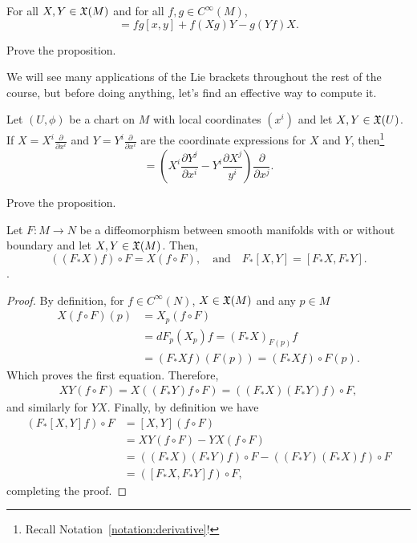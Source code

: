 \begin{proposition}
  For all $X, Y \in \mathfrak{X}(M)$ and for all $f,g\in C^\infty(M)$,
  \begin{equation}
    [fX, gY] = fg[x,y] + f(Xg)Y - g(Yf)X.
  \end{equation}
\end{proposition}
\begin{exercise}
  Prove the proposition.
\end{exercise}

We will see many applications of the Lie brackets throughout the rest of the course, but before doing anything, let's find an effective way to compute it.

\begin{proposition}
    Let $(U, \phi)$ be a chart on $M$ with local coordinates $(x^i)$ and let $X,Y\in\mathfrak{X}(U)$.
    If $X = X^i \frac{\partial }{\partial x^i}$ and $Y = Y^i \frac{\partial}{\partial x^i}$ are the coordinate expressions for $X$ and $Y$, then\footnote{Recall Notation~\ref{notation:derivative}!}
    \begin{equation}
        [X,Y] = \left(X^i\frac{\partial Y^j}{\partial x^i} - Y^i\frac{\partial X^j}{y^i}\right)\frac{\partial}{\partial x^j}.
    \end{equation}
\end{proposition}
\begin{exercise}
  Prove the proposition.
\end{exercise}

\begin{theorem}\label{thm:liealgiso}
  Let $F:M\to N$ be a diffeomorphism between smooth manifolds with or without boundary and let $X, Y \in\mathfrak{X}(M)$. Then,
  \begin{equation}
    \left((F_* X)f\right)\circ F = X(f\circ F), \quad\mbox{and}\quad
    F_* [X,Y] = [F_* X, F_* Y].
  \end{equation}.
\end{theorem}
\begin{proof}
  By definition, for $f\in C^\infty(N)$, $X\in\mathfrak{X}(M)$ and any $p\in M$
  \begin{align}
    X(f\circ F)(p) &= X_p(f\circ F) \\
    &= dF_p(X_p)f = (F_* X)_{F(p)}f \\
    &= (F_*X f)(F(p)) = (F_*X f)\circ F(p).
  \end{align}
  Which proves the first equation.
  Therefore,
  \begin{align}
    X Y (f\circ F) = X ((F_* Y) f \circ F) 
    = ((F_* X) (F_* Y) f) \circ F,
  \end{align}
  and similarly for $Y X$.
  Finally, by definition we have
  \begin{align}
    (F_* [X,Y] f)\circ F
    &= [X,Y](f\circ F) \\
    &= XY (f\circ F) - YX (f\circ F) \\
    &= ((F_* X) (F_* Y)f)\circ F - ((F_* Y) (F_* X)f)\circ F\\
    &= ([F_* X, F_* Y]f)\circ F,
  \end{align}
  completing the proof.
\end{proof}


